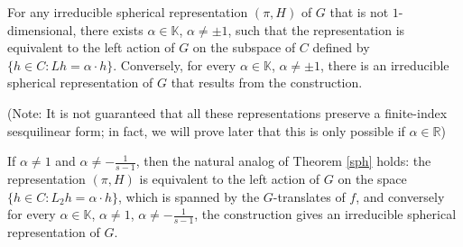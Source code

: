 \documentclass[10pt,a4paper]{amsart}
\begin{document}
\begin{thm} \label{sph}
For any irreducible spherical representation $(\pi,H)$ of $G$ that is not $1$-dimensional, there exists $\alpha\in\mathbb{K}$, $\alpha\neq\pm 1$, such that the representation is equivalent to the left action of $G$ on the subspace of $C$ defined by $\{h\in C: Lh=\alpha\cdot h\}$. Conversely, for every $\alpha\in\mathbb{K}$, $\alpha\neq\pm 1$, there is an irreducible spherical representation of $G$ that results from the construction.

(Note: It is not guaranteed that all these representations preserve a finite-index sesquilinear form; in fact, we will prove later that this is only possible if $\alpha\in\mathbb{R}$)
\end{thm}

\begin{thm} \label{sph2}
If $\alpha\neq 1$ and $\alpha\neq -\frac{1}{s-1}$, then the natural analog of Theorem \ref{sph} holds: the representation $(\pi,H)$ is equivalent to the left action of $G$ on the space $\{h\in C: L_2 h=\alpha\cdot h\}$, which is spanned by the $G$-translates of $f$, and conversely for every $\alpha\in\mathbb{K}$, $\alpha\neq 1$, $\alpha\neq -\frac{1}{s-1}$, the construction gives an irreducible spherical representation of $G$.
\end{thm}
\end{document}
